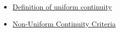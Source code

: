 \begin{dependencies}
\begin{itemize}
  \item \hyperref[def:uniform-continuity]{Definition of uniform continuity}
  \item \hyperref[prop:non-uniform-continuity-criteria]{Non-Uniform Continuity Criteria}
\end{itemize}
\end{dependencies}

\clearpage
